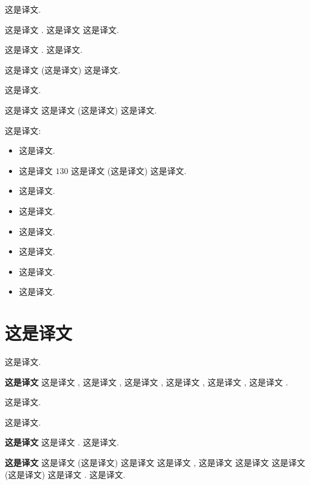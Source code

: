 \documentclass[sigconf]{acmart}
\begin{document}
	这是译文.
	
	这是译文 \cite{City_Story_Kling_2012,Twitter_Hawelka_2014}. 这是译文 \cite{Twitter_Hawelka_2014} 这是译文.
	
	这是译文 \cite{Flickr_Kisilevich_2010,VGI_Sun_2013,Magnetism_Paldino_2015,Emotions_Hauthal_2016,Travel_Yuan_2016}. 这是译文.
	
	这是译文 (这是译文) 这是译文.
	
	这是译文.
	
	这是译文 \cite{ucf101,activityNet,KarpathyCVPR14,YouTube_8M_2016} 这是译文 (这是译文) 这是译文.
	
	这是译文:
	
	\begin{itemize}
		\item 这是译文.
		\item 这是译文 $130$ 这是译文 (这是译文) 这是译文.
		\item 这是译文.
		\item 这是译文.
		\item 这是译文.
		\item 这是译文.
		\item 这是译文.
		\item 这是译文.
	\end{itemize}
	
	
	\section{这是译文}
	\label{sec:related_work}  这是译文.
	
	\noindent \textbf{这是译文}  这是译文 \cite{CrandallMapWorld09}, 这是译文 \cite{landuse_yi_sigspatial_2015}, 这是译文 \cite{Haysim2gps08,geolocalization_Gupta_2016}, 这是译文 \cite{3dModelSnavely08}, 这是译文 \cite{Magnetism_Paldino_2015}, 这是译文 \cite{emotion_yi_sigspatial_2016}.
	
	这是译文.
	
	这是译文.
	
	\noindent \textbf{这是译文}  这是译文 \cite{Overhead_Hammoud_2013,Structure_Bodensteiner_2015,event_More_2016,geolocalization_Gupta_2016}.  这是译文.
	
	\noindent \textbf{这是译文}  这是译文 (这是译文) \cite{idtfWang2013} 这是译文 \cite{peng2014action,MIFS2015,dovf_lan_2017} 这是译文 \cite{KarpathyCVPR14,c3d2015}, 这是译文 \cite{twostream2014, wanggoodpractice2015} 这是译文 \cite{tvl1realTime} 这是译文 (这是译文) 这是译文 \cite{wanggoodpractice2015,convTwoStream2016,depth2action,TSN2016,res_two_stream_nips16,diba_tle_2016}. 这是译文.
	
\end{document}
